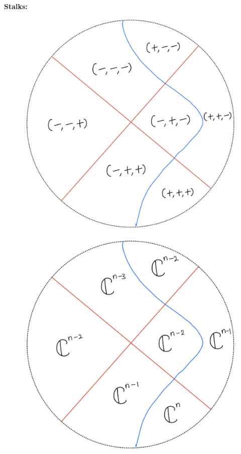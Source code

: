 \textbf{Stalks:}
\begin{figure}[H]
    \centering
    \includegraphics[scale = 0.45]{diagrams/lemma4/22.png}
    \caption{}
    \label{fig:your-label}
\end{figure}
\begin{figure}[H]
    \centering
    \includegraphics[scale = 0.45]{diagrams/cobord'4/23.png}
    \caption{}
    \label{fig:your-label}
\end{figure}
